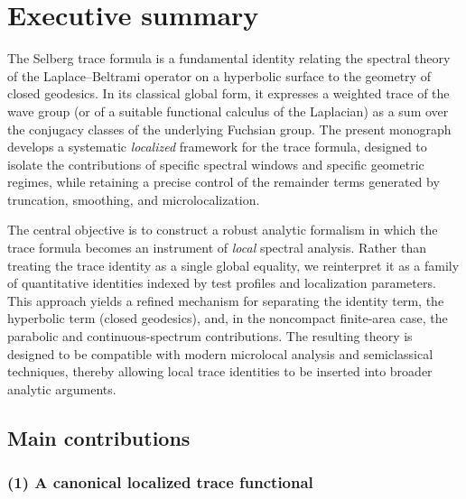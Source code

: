 
\chapter*{Executive summary}

\noindent
The Selberg trace formula is a fundamental identity relating the spectral theory of the Laplace--Beltrami operator on a hyperbolic surface to the geometry of closed geodesics.
In its classical global form, it expresses a weighted trace of the wave group (or of a suitable functional calculus of the Laplacian) as a sum over the conjugacy classes of the underlying Fuchsian group.
The present monograph develops a systematic \emph{localized} framework for the trace formula, designed to isolate the contributions of specific spectral windows and specific geometric regimes, while retaining a precise control of the remainder terms generated by truncation, smoothing, and microlocalization.

\medskip

\noindent
The central objective is to construct a robust analytic formalism in which the trace formula becomes an instrument of \emph{local} spectral analysis.
Rather than treating the trace identity as a single global equality, we reinterpret it as a family of quantitative identities indexed by test profiles and localization parameters.
This approach yields a refined mechanism for separating the identity term, the hyperbolic term (closed geodesics), and, in the noncompact finite-area case, the parabolic and continuous-spectrum contributions.
The resulting theory is designed to be compatible with modern microlocal analysis and semiclassical techniques, thereby allowing local trace identities to be inserted into broader analytic arguments.

\section*{Main contributions}

\subsection*{(1) A canonical localized trace functional}

